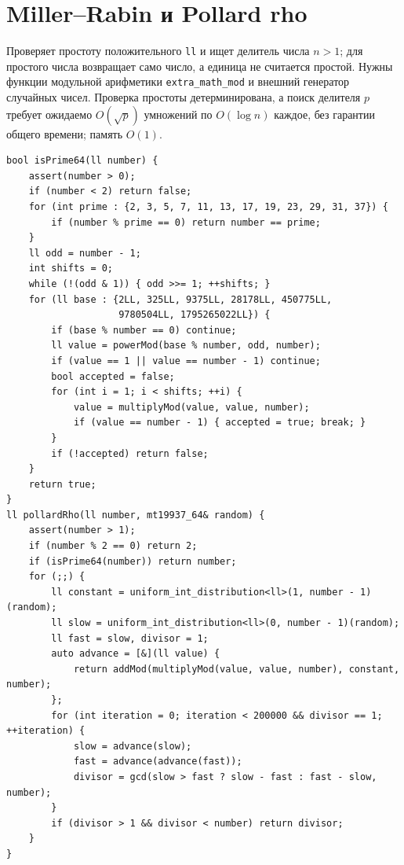 \section{Miller--Rabin и Pollard rho}
Проверяет простоту положительного \texttt{ll} и ищет делитель числа $n>1$; для простого числа возвращает само число, а единица не считается простой.
Нужны функции модульной арифметики \texttt{extra\_math\_mod} и внешний генератор случайных чисел.
Проверка простоты детерминирована, а поиск делителя $p$ требует ожидаемо $O(\sqrt p)$ умножений по $O(\log n)$ каждое, без гарантии общего времени; память $O(1)$.
\begin{lstlisting}[name=extra_math_rho]
bool isPrime64(ll number) {
    assert(number > 0);
    if (number < 2) return false;
    for (int prime : {2, 3, 5, 7, 11, 13, 17, 19, 23, 29, 31, 37}) {
        if (number % prime == 0) return number == prime;
    }
    ll odd = number - 1;
    int shifts = 0;
    while (!(odd & 1)) { odd >>= 1; ++shifts; }
    for (ll base : {2LL, 325LL, 9375LL, 28178LL, 450775LL,
                    9780504LL, 1795265022LL}) {
        if (base % number == 0) continue;
        ll value = powerMod(base % number, odd, number);
        if (value == 1 || value == number - 1) continue;
        bool accepted = false;
        for (int i = 1; i < shifts; ++i) {
            value = multiplyMod(value, value, number);
            if (value == number - 1) { accepted = true; break; }
        }
        if (!accepted) return false;
    }
    return true;
}
ll pollardRho(ll number, mt19937_64& random) {
    assert(number > 1);
    if (number % 2 == 0) return 2;
    if (isPrime64(number)) return number;
    for (;;) {
        ll constant = uniform_int_distribution<ll>(1, number - 1)(random);
        ll slow = uniform_int_distribution<ll>(0, number - 1)(random);
        ll fast = slow, divisor = 1;
        auto advance = [&](ll value) {
            return addMod(multiplyMod(value, value, number), constant, number);
        };
        for (int iteration = 0; iteration < 200000 && divisor == 1; ++iteration) {
            slow = advance(slow);
            fast = advance(advance(fast));
            divisor = gcd(slow > fast ? slow - fast : fast - slow, number);
        }
        if (divisor > 1 && divisor < number) return divisor;
    }
}
\end{lstlisting}
%

